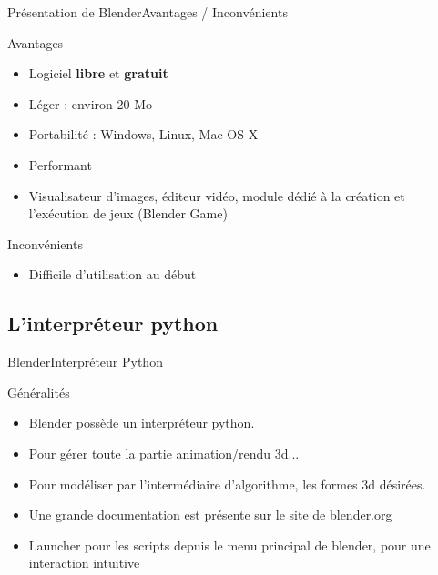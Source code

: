 \documentclass{beamer}
\begin{document}
\begin{frame}[c]{Présentation de Blender}{Avantages / Inconvénients}

    \begin{block}{Avantages}
        \begin{itemize}
            \item Logiciel \textbf{libre} et \textbf{gratuit} %
            \item Léger : environ 20 Mo
            \item Portabilité : Windows, Linux, Mac OS X
            \item Performant
            \item Visualisateur d'images, éditeur vidéo, module dédié à la création et l'exécution de jeux (Blender Game)
        \end{itemize}
    \end{block}

    \begin{block}{Inconvénients}
        \begin{itemize}
            \item Difficile d'utilisation au début
        \end{itemize}
    \end{block}
\end{frame}

\subsection{L'interpréteur python}

\begin{frame}{Blender}{Interpréteur Python}
    \begin{block}{Généralités}
    \begin{itemize}
    \item{
        Blender possède un interpréteur python.    
    }
    \item{
        Pour gérer toute la partie animation/rendu 3d...
    }
    \item{
        Pour modéliser par l'intermédiaire d'algorithme, les formes 3d désirées.
    }
    \item{
        Une grande documentation est présente sur le site de blender.org
    }
    \item{
        Launcher pour les scripts depuis le menu principal de blender, pour une interaction intuitive
    }
    \end{itemize}
    \end{block}
\end{frame}
\end{document}
